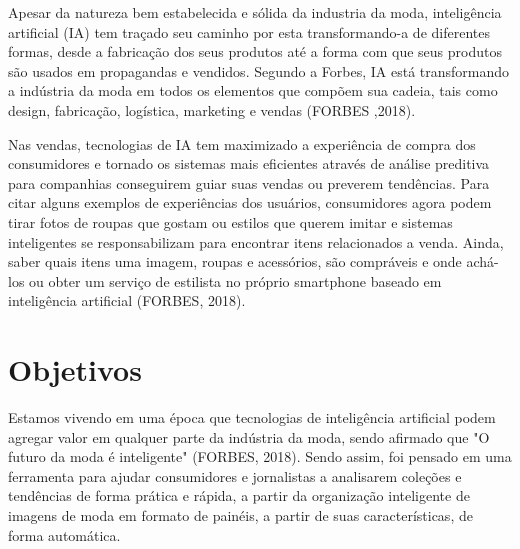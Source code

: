 \documentclass[12pt]{report}
\begin{document}

Apesar da natureza bem estabelecida e sólida da industria da moda, inteligência artificial (IA) tem traçado seu caminho por esta transformando-a de diferentes formas, desde a fabricação dos seus produtos até a forma com que seus produtos são usados em propagandas e vendidos. Segundo a Forbes, IA está transformando a indústria da moda em todos os elementos que compõem sua cadeia, tais como design, fabricação, logística, marketing e vendas (FORBES ,2018).

Nas vendas, tecnologias de IA tem maximizado a experiência de compra dos consumidores e tornado os sistemas mais eficientes através de análise preditiva para companhias conseguirem guiar suas vendas ou preverem tendências. Para citar alguns exemplos de experiências dos usuários, consumidores agora podem tirar fotos de roupas que gostam ou estilos que querem imitar e sistemas inteligentes se responsabilizam para encontrar itens relacionados a venda. Ainda, saber quais itens uma imagem, roupas e acessórios, são compráveis e onde achá-los ou obter um serviço de estilista no próprio smartphone baseado em inteligência artificial (FORBES, 2018).

\section{Objetivos}

Estamos vivendo em uma época que tecnologias de inteligência artificial podem agregar valor em qualquer parte da indústria da moda, sendo afirmado que "O futuro da moda é inteligente" (FORBES, 2018). Sendo assim, foi pensado em uma ferramenta para ajudar consumidores e jornalistas a analisarem coleções e tendências de forma prática e rápida, a partir da organização inteligente de imagens de moda em formato de painéis, a partir de suas características, de forma automática. 
\end{document}
